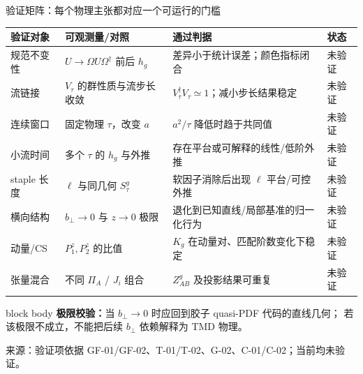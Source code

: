 \documentclass[UTF8,aspectratio=169,11pt]{ctexbeamer}
\newcommand{\source}[1]{%
  \par\vspace{0.05em}%
  {\raggedright\scriptsize\color{muted}来源：#1\par}}
\newcommand{\unverified}{\textcolor{warning}{未验证}}
\begin{document}
\begin{frame}[t]{验证矩阵：每个物理主张都对应一个可运行的门槛}
  \scriptsize
  \begin{tabularx}{\textwidth}{@{}p{2.3cm}p{3.35cm}X p{1.45cm}@{}}
    \toprule
    验证对象 & 可观测量/对照 & 通过判据 & 状态 \\
    \midrule
    规范不变性 & $U\to\Omega U\Omega^\dagger$ 前后 $h_g$ & 差异小于统计误差；颜色指标闭合 & \unverified \\
    流链接 & $V_\tau$ 的群性质与流步长收敛 & $V_\tau^\dagger V_\tau\simeq1$；减小步长结果稳定 & \unverified \\
    连续窗口 & 固定物理 $\tau$，改变 $a$ & $a^2/\tau$ 降低时趋于共同值 & \unverified \\
    小流时间 & 多个 $\tau$ 的 $h_g$ 与外推 & 存在平台或可解释的线性/低阶外推 & \unverified \\
    staple 长度 & $\ell$ 与同几何 $S_\tau^g$ & 软因子消除后出现 $\ell$ 平台/可控外推 & \unverified \\
    横向结构 & $b_\perp\to0$ 与 $z\to0$ 极限 & 退化到已知直线/局部基准的归一化行为 & \unverified \\
    动量/CS & $P_1^z,P_2^z$ 的比值 & $K_g$ 在动量对、匹配阶数变化下稳定 & \unverified \\
    张量混合 & 不同 $\Pi_A$ / $J_i$ 组合 & $Z^g_{AB}$ 及投影结果可重复 & \unverified \\
    \bottomrule
  \end{tabularx}
  \vfill
  \begin{beamercolorbox}[wd=\textwidth,sep=0.55em,rounded=true]{block body}
    \textbf{极限校验：}当 $b_\perp\to0$ 时应回到胶子 quasi-PDF 代码的直线几何；
    若该极限不成立，不能把后续 $b_\perp$ 依赖解释为 TMD 物理。
  \end{beamercolorbox}
  \source{验证项依据 GF-01/GF-02、T-01/T-02、G-02、C-01/C-02；当前均未验证。}
\end{frame}
\end{document}

